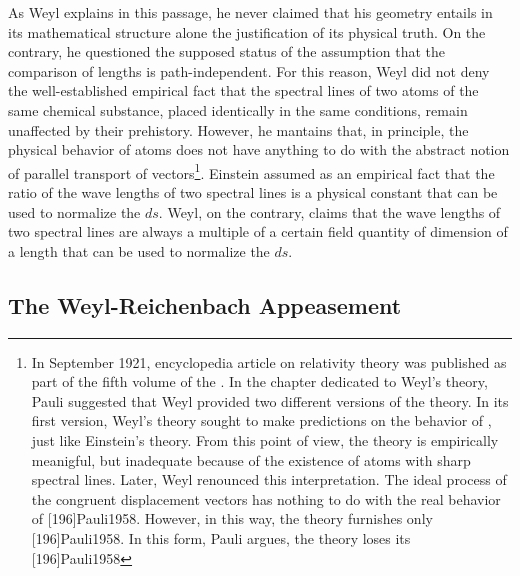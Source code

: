 \documentclass[final]{article}
\newcommand{\WT}{Weyl's theory\xspace}
\begin{document}
As Weyl explains in this passage, he never claimed that his geometry entails in its mathematical structure alone the \apr justification of its physical truth. On the contrary, he questioned the supposed \apr status of the assumption that the comparison of lengths is path-independent. For this reason, Weyl did not deny the well-established empirical fact that the spectral lines of two atoms of the same chemical substance, placed identically in the same conditions, remain unaffected by their prehistory. However, he mantains that, in principle, the physical behavior of atoms does not have anything to do with the abstract notion of parallel transport of vectors\footnote{\label{pauli}In September 1921,  encyclopedia article on relativity theory was published as part of the fifth volume of the . In the chapter dedicated to \WT, Pauli suggested that Weyl provided two different versions of the theory. In its first version, \WT sought to make predictions on the behavior of \rac, just like Einstein's theory. From this point of view, the theory is empirically meanigful, but inadequate because of the existence of atoms with sharp spectral lines. Later, Weyl renounced this interpretation. The ideal process of the congruent displacement vectors has nothing to do with the real behavior of \rac {}[196]{Pauli1958}. However, in this way, the theory furnishes only  [196]{Pauli1958}. In this form, Pauli argues, the theory loses its  [196]{Pauli1958}}. Einstein assumed as an empirical fact that the ratio of the wave lengths of two spectral lines is a  physical constant that can be used to normalize the $ds$. Weyl, on the contrary, claims that the wave lengths of two spectral lines are always a multiple of a certain field quantity of dimension of a length that can be used to normalize the $ds$. 

\subsection{The Weyl-Reichenbach Appeasement}

  
\end{document}
